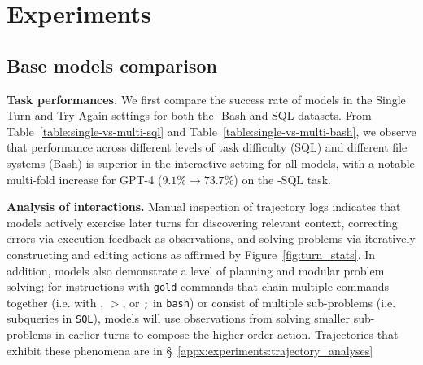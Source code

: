 \section{Experiments}
\label{sec:experiments}



\subsection{Base models comparison}
\label{sec:experiments:base_compare}
\textbf{Task performances.} We first compare the success rate of models in the Single Turn and Try Again settings for both the \benchmark{}-Bash and SQL datasets.
From Table~\ref{table:single-vs-multi-sql} and Table~\ref{table:single-vs-multi-bash}, we observe that performance across different levels of task difficulty (SQL) and different file systems (Bash) is superior in the interactive setting for all models, with a notable multi-fold increase for GPT-4 ($9.1\% \rightarrow 73.7\%$) on the \benchmark{}-SQL task.

\textbf{Analysis of interactions.} Manual inspection of trajectory logs indicates that models actively exercise later turns for discovering relevant context, correcting errors via execution feedback as observations, and solving problems via iteratively constructing and editing actions as affirmed by Figure~\ref{fig:turn_stats}.
In addition, models also demonstrate a level of planning and modular problem solving; for instructions with \texttt{gold} commands that chain multiple commands together (i.e. with \text{\textbar}, $>$, or \texttt{;} in \texttt{bash}) or consist of multiple sub-problems (i.e. subqueries in \texttt{SQL}), models will use observations from solving smaller sub-problems in earlier turns to compose the higher-order action. Trajectories that exhibit these phenomena are in \S~\ref{appx:experiments:trajectory_analyses}


